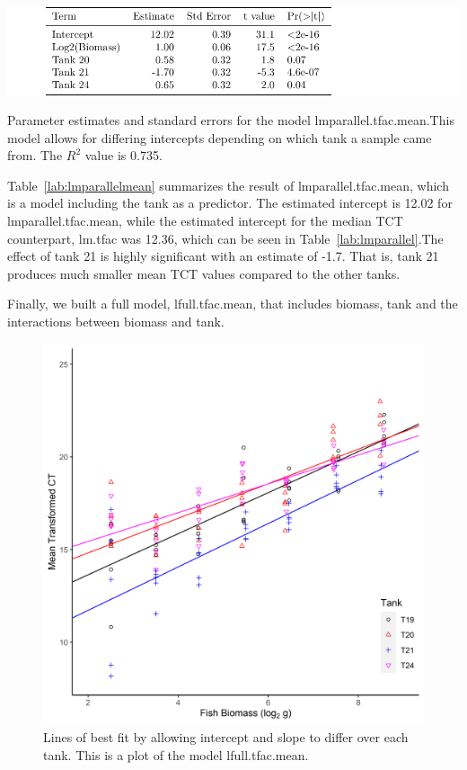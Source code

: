 \begin{table}[H]
\includegraphics{Chapter3Images/lmMean2.pdf}
\caption{\hspace{1mm}Parameter estimates and standard errors for the model lmparallel.tfac.mean.This model allows for differing intercepts depending on which tank a sample came from. The $R^{2}$ value is 0.735.}
\label{lab:lmparallelmean}
\end{table}


Table~\ref{lab:lmparallelmean} summarizes the result of lmparallel.tfac.mean, which is a model including the tank as a predictor. The estimated intercept is 12.02 for lmparallel.tfac.mean, while the estimated intercept for the median TCT counterpart, lm.tfac was 12.36, which can be seen in Table~\ref{lab:lmparallel}.The effect of tank 21 is highly significant with an estimate of -1.7. That is, tank 21 produces much smaller mean TCT values compared to the other tanks.




\newpage

Finally, we built a full model, lfull.tfac.mean, that includes biomass, tank and the interactions between biomass and tank.

\begin{figure}[H]
\includegraphics{Chapter3Images/ggplotnew7.png}
\caption{ \hspace{1mm}Lines of best fit by allowing intercept and slope to differ over each tank. This is a plot of the model lfull.tfac.mean.}
\label{fig:parmean}
\end{figure}


